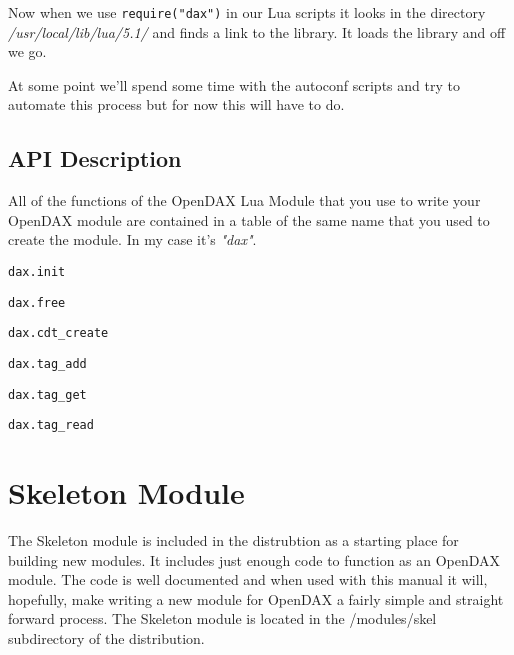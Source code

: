 Now when we use \verb|require("dax")| in our Lua scripts it looks in the directory \textit{/usr/local/lib/lua/5.1/} and finds a link to the library.  It loads the library and off we go.

At some point we'll spend some time with the autoconf scripts and try to automate this process but for now this will have to do.

\section{API Description}

All of the functions of the OpenDAX Lua Module that you use to write your OpenDAX module are contained in a table of the same name that you used to create the module.  In my case it's \textit{"dax"}.

\begin{verbatim}
dax.init
\end{verbatim}

\begin{verbatim}
dax.free
\end{verbatim}

\begin{verbatim}
dax.cdt_create
\end{verbatim}

\begin{verbatim}
dax.tag_add
\end{verbatim}

\begin{verbatim}
dax.tag_get
\end{verbatim}

\begin{verbatim}
dax.tag_read
\end{verbatim}


\appendix



\chapter{Skeleton Module}
The Skeleton module is included in the distrubtion as a starting place for building new modules.  It includes just enough code to function as an OpenDAX module.  The code is well documented and when used with this manual it will, hopefully, make writing a new module for OpenDAX a fairly simple and straight forward process.  The Skeleton module is located in the /modules/skel subdirectory of the distribution.

